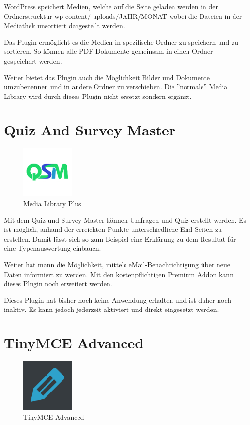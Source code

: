 \documentclass[a4paper,11pt,twoside,titlepage,openright]{report}
\numberwithin{equation}{section}		%
\numberwithin{figure}{section}			%
\numberwithin{table}{section}				%
\begin{document}
WordPress speichert Medien, welche auf die Seite geladen werden in der Ordnerstrucktur wp-content/ uploads/JAHR/MONAT wobei die Dateien in der Mediathek unsortiert dargestellt werden.

Das Plugin ermöglicht es die Medien in spezifische Ordner zu speichern und zu sortieren. So können alle PDF-Dokumente gemeinsam in einen Ordner gespeichert werden.

Weiter bietet das Plugin auch die Möglichkeit Bilder und Dokumente umzubenennen und in andere Ordner zu verschieben. Die ''normale'' Media Library wird durch dieses Plugin nicht ersetzt sondern ergänzt.
\newpage

\section{Quiz And Survey Master}

\begin{figure}
\vspace{-20px}
\centering
\includegraphics[width=100px]{Images/Quiz_Survey_Master.png}
\caption{Media Library Plus}
\vspace{-10px}
\end{figure}

Mit dem Quiz und Survey Master können Umfragen und Quiz erstellt werden. Es ist möglich, anhand der erreichten Punkte unterschiedliche End-Seiten zu erstellen. Damit lässt sich so zum Beispiel eine Erklärung zu dem Resultat für eine Typenauswertung einbauen.

Weiter hat mann die Möglichkeit, mittels eMail-Benachrichtigung über neue Daten informiert zu werden. Mit den kostenpflichtigen Premium Addon kann dieses Plugin noch erweitert werden.

Dieses Plugin hat bisher noch keine Anwendung erhalten und ist daher noch inaktiv. Es kann jedoch jederzeit aktiviert und direkt eingesetzt werden.

\section{TinyMCE Advanced}

\begin{figure}
\vspace{-20px}
\centering
\includegraphics[width=100px]{Images/TinyMCE.png}
\caption{TinyMCE Advanced}
\vspace{-10px}
\end{figure}
\end{document}

